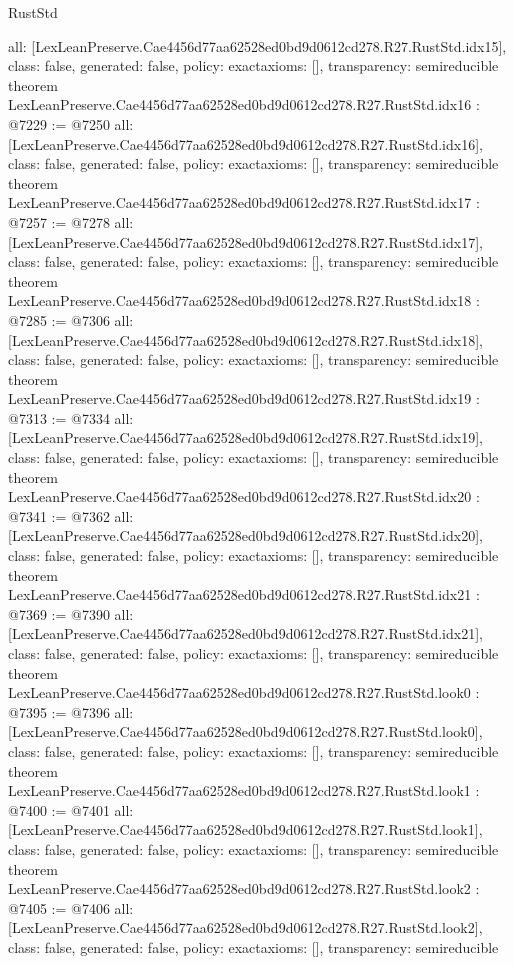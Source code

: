 \begin{lexlean}{RustStd}
\begin{coremodule}
{  all: [LexLeanPreserve.Cae4456d77aa62528ed0bd9d0612cd278.R27.RustStd.idx15],
  class: false,
  generated: false,
  policy: exact{axioms: []},
  transparency: semireducible
}
theorem LexLeanPreserve.Cae4456d77aa62528ed0bd9d0612cd278.R27.RustStd.idx16 : @7229 := @7250 {
  all: [LexLeanPreserve.Cae4456d77aa62528ed0bd9d0612cd278.R27.RustStd.idx16],
  class: false,
  generated: false,
  policy: exact{axioms: []},
  transparency: semireducible
}
theorem LexLeanPreserve.Cae4456d77aa62528ed0bd9d0612cd278.R27.RustStd.idx17 : @7257 := @7278 {
  all: [LexLeanPreserve.Cae4456d77aa62528ed0bd9d0612cd278.R27.RustStd.idx17],
  class: false,
  generated: false,
  policy: exact{axioms: []},
  transparency: semireducible
}
theorem LexLeanPreserve.Cae4456d77aa62528ed0bd9d0612cd278.R27.RustStd.idx18 : @7285 := @7306 {
  all: [LexLeanPreserve.Cae4456d77aa62528ed0bd9d0612cd278.R27.RustStd.idx18],
  class: false,
  generated: false,
  policy: exact{axioms: []},
  transparency: semireducible
}
theorem LexLeanPreserve.Cae4456d77aa62528ed0bd9d0612cd278.R27.RustStd.idx19 : @7313 := @7334 {
  all: [LexLeanPreserve.Cae4456d77aa62528ed0bd9d0612cd278.R27.RustStd.idx19],
  class: false,
  generated: false,
  policy: exact{axioms: []},
  transparency: semireducible
}
theorem LexLeanPreserve.Cae4456d77aa62528ed0bd9d0612cd278.R27.RustStd.idx20 : @7341 := @7362 {
  all: [LexLeanPreserve.Cae4456d77aa62528ed0bd9d0612cd278.R27.RustStd.idx20],
  class: false,
  generated: false,
  policy: exact{axioms: []},
  transparency: semireducible
}
theorem LexLeanPreserve.Cae4456d77aa62528ed0bd9d0612cd278.R27.RustStd.idx21 : @7369 := @7390 {
  all: [LexLeanPreserve.Cae4456d77aa62528ed0bd9d0612cd278.R27.RustStd.idx21],
  class: false,
  generated: false,
  policy: exact{axioms: []},
  transparency: semireducible
}
theorem LexLeanPreserve.Cae4456d77aa62528ed0bd9d0612cd278.R27.RustStd.look0 : @7395 := @7396 {
  all: [LexLeanPreserve.Cae4456d77aa62528ed0bd9d0612cd278.R27.RustStd.look0],
  class: false,
  generated: false,
  policy: exact{axioms: []},
  transparency: semireducible
}
theorem LexLeanPreserve.Cae4456d77aa62528ed0bd9d0612cd278.R27.RustStd.look1 : @7400 := @7401 {
  all: [LexLeanPreserve.Cae4456d77aa62528ed0bd9d0612cd278.R27.RustStd.look1],
  class: false,
  generated: false,
  policy: exact{axioms: []},
  transparency: semireducible
}
theorem LexLeanPreserve.Cae4456d77aa62528ed0bd9d0612cd278.R27.RustStd.look2 : @7405 := @7406 {
  all: [LexLeanPreserve.Cae4456d77aa62528ed0bd9d0612cd278.R27.RustStd.look2],
  class: false,
  generated: false,
  policy: exact{axioms: []},
  transparency: semireducible
}
\end{coremodule}
\end{lexlean}
